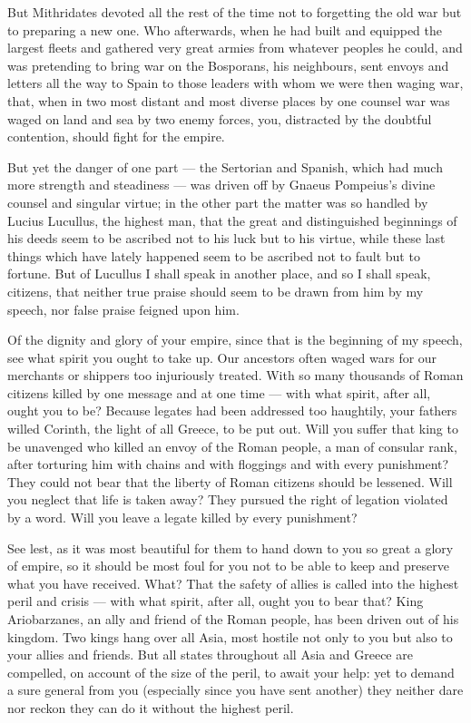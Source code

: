  But Mithridates devoted all the rest of the time not to forgetting the old war but to preparing a new one. Who afterwards, when he had built and equipped the largest fleets and gathered very great armies from whatever peoples he could, and was pretending to bring war on the Bosporans, his neighbours, sent envoys and letters all the way to Spain to those leaders with whom we were then waging war, that, when in two most distant and most diverse places by one counsel war was waged on land and sea by two enemy forces, you, distracted by the doubtful contention, should fight for the empire.

 But yet the danger of one part --- the Sertorian and Spanish, which had much more strength and steadiness --- was driven off by Gnaeus Pompeius's divine counsel and singular virtue; in the other part the matter was so handled by Lucius Lucullus, the highest man, that the great and distinguished beginnings of his deeds seem to be ascribed not to his luck but to his virtue, while these last things which have lately happened seem to be ascribed not to fault but to fortune. But of Lucullus I shall speak in another place, and so I shall speak, citizens, that neither true praise should seem to be drawn from him by my speech, nor false praise feigned upon him.

 Of the dignity and glory of your empire, since that is the beginning of my speech, see what spirit you ought to take up. Our ancestors often waged wars for our merchants or shippers too injuriously treated. With so many thousands of Roman citizens killed by one message and at one time --- with what spirit, after all, ought you to be? Because legates had been addressed too haughtily, your fathers willed Corinth, the light of all Greece, to be put out. Will you suffer that king to be unavenged who killed an envoy of the Roman people, a man of consular rank, after torturing him with chains and with floggings and with every punishment? They could not bear that the liberty of Roman citizens should be lessened. Will you neglect that life is taken away? They pursued the right of legation violated by a word. Will you leave a legate killed by every punishment?

 See lest, as it was most beautiful for them to hand down to you so great a glory of empire, so it should be most foul for you not to be able to keep and preserve what you have received. What? That the safety of allies is called into the highest peril and crisis --- with what spirit, after all, ought you to bear that? King Ariobarzanes, an ally and friend of the Roman people, has been driven out of his kingdom. Two kings hang over all Asia, most hostile not only to you but also to your allies and friends. But all states throughout all Asia and Greece are compelled, on account of the size of the peril, to await your help: yet to demand a sure general from you (especially since you have sent another) they neither dare nor reckon they can do it without the highest peril.

